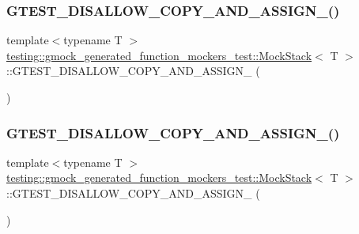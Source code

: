 \subsubsection{\texorpdfstring{GTEST\_DISALLOW\_COPY\_AND\_ASSIGN\_()}{GTEST\_DISALLOW\_COPY\_AND\_ASSIGN\_()}\hspace{0.1cm}{\footnotesize\ttfamily [1/3]}}
{\footnotesize\ttfamily template$<$typename T $>$ \\
\mbox{\hyperlink{classtesting_1_1gmock__generated__function__mockers__test_1_1_mock_stack}{testing\+::gmock\+\_\+generated\+\_\+function\+\_\+mockers\+\_\+test\+::\+Mock\+Stack}}$<$ T $>$\+::G\+T\+E\+S\+T\+\_\+\+D\+I\+S\+A\+L\+L\+O\+W\+\_\+\+C\+O\+P\+Y\+\_\+\+A\+N\+D\+\_\+\+A\+S\+S\+I\+G\+N\+\_\+ (\begin{DoxyParamCaption}\item[{\mbox{\hyperlink{classtesting_1_1gmock__generated__function__mockers__test_1_1_mock_stack}{Mock\+Stack}}$<$ T $>$}]{ }\end{DoxyParamCaption})\hspace{0.3cm}{\ttfamily [private]}}

\mbox{\label{classtesting_1_1gmock__generated__function__mockers__test_1_1_mock_stack_a769b47c7a69cbf6b1aab29e40005c234}} 
\subsubsection{\texorpdfstring{GTEST\_DISALLOW\_COPY\_AND\_ASSIGN\_()}{GTEST\_DISALLOW\_COPY\_AND\_ASSIGN\_()}\hspace{0.1cm}{\footnotesize\ttfamily [2/3]}}
{\footnotesize\ttfamily template$<$typename T $>$ \\
\mbox{\hyperlink{classtesting_1_1gmock__generated__function__mockers__test_1_1_mock_stack}{testing\+::gmock\+\_\+generated\+\_\+function\+\_\+mockers\+\_\+test\+::\+Mock\+Stack}}$<$ T $>$\+::G\+T\+E\+S\+T\+\_\+\+D\+I\+S\+A\+L\+L\+O\+W\+\_\+\+C\+O\+P\+Y\+\_\+\+A\+N\+D\+\_\+\+A\+S\+S\+I\+G\+N\+\_\+ (\begin{DoxyParamCaption}\item[{\mbox{\hyperlink{classtesting_1_1gmock__generated__function__mockers__test_1_1_mock_stack}{Mock\+Stack}}$<$ T $>$}]{ }\end{DoxyParamCaption})\hspace{0.3cm}{\ttfamily [private]}}

